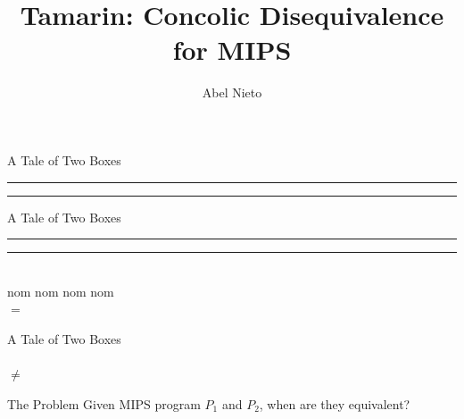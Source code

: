 \documentclass[pdf]{beamer}
\title{Tamarin: Concolic Disequivalence for MIPS}
\author{Abel Nieto}
\date{}
\newcommand{\crule}[3][black]{\textcolor{#1}{\rule{#2}{#3}}}
\begin{document}
\begin{frame}
\titlepage
\end{frame}

\begin{frame}{A Tale of Two Boxes}
~\\
\crule{3cm}{3cm} \hspace{2cm} \crule{3cm}{3cm}
\end{frame}

\begin{frame}{A Tale of Two Boxes}
\hspace{3.5cm}
\\
\crule{3cm}{3cm} \hspace{2cm} \crule{3cm}{3cm}
\pause
\\
nom nom
\pause
\hspace{3.5cm}
nom nom
\pause
\\
\hspace{3.5cm}
{\Huge $=$}
\end{frame}

\begin{frame}{A Tale of Two Boxes}
~\\
 \hspace{2cm} 
\\
\hspace{5cm} {\Huge $\neq$}
\end{frame}

\Large

\begin{frame}{The Problem}
Given MIPS program $P_1$ and $P_2$, when are they equivalent?
\end{frame}
\end{document}
